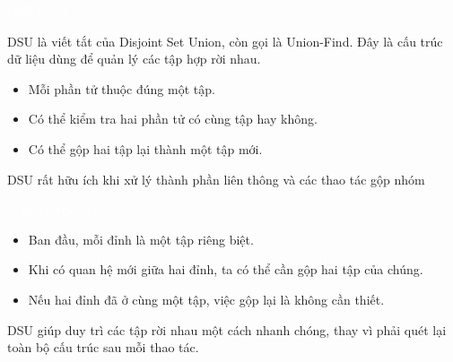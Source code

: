 \documentclass{beamer}
\title{\hlred{DSU (gộp tập rời nhau)}}
\author{Nhóm 3}
\date{\hlcyan{03/2026}}
\newcommand{\hlblue}[1]{\textcolor{myblue}{#1}}
\newcommand{\hlgreen}[1]{\textcolor{mygreen}{#1}}
\newcommand{\hlred}[1]{\textcolor{myred}{#1}}
\newcommand{\hlpurple}[1]{\textcolor{mypurple}{#1}}
\newcommand{\hlorange}[1]{\textcolor{myorange}{#1}}
\newcommand{\hlwhite}[1]{\textcolor{white}{#1}}
\begin{document}
\frame{\titlepage}


\begin{frame}{\hlwhite{DSU là gì?}}
\begin{tcolorbox}[title=\textbf{\hlgreen{Khái niệm}}]
\hlblue{DSU} là viết tắt của \hlpurple{Disjoint Set Union}, còn gọi là \hlpurple{Union-Find}. Đây là cấu trúc dữ liệu dùng để quản lý các tập hợp \hlred{rời nhau}.
\end{tcolorbox}

\begin{itemize}
  \item Mỗi phần tử thuộc đúng \hlblue{một tập}.
  \item Có thể kiểm tra hai phần tử có cùng tập hay không.
  \item Có thể gộp hai tập lại thành một tập mới.
\end{itemize}

\begin{tcolorbox}
\centering
\hlorange{DSU rất hữu ích khi xử lý thành phần liên thông và các thao tác gộp nhóm}
\end{tcolorbox}
\end{frame}


\begin{frame}{\hlwhite{Ý tưởng trực quan}}
\begin{itemize}
  \item Ban đầu, mỗi đỉnh là một tập riêng biệt.
  \item Khi có quan hệ mới giữa hai đỉnh, ta có thể cần gộp hai tập của chúng.
  \item Nếu hai đỉnh đã ở cùng một tập, việc gộp lại là không cần thiết.
\end{itemize}

\pause

\begin{tcolorbox}[title=\textbf{\hlgreen{Mục tiêu}}]
DSU giúp duy trì các tập rời nhau một cách nhanh chóng, thay vì phải quét lại toàn bộ cấu trúc sau mỗi thao tác.
\end{tcolorbox}
\end{frame}

\end{document}
